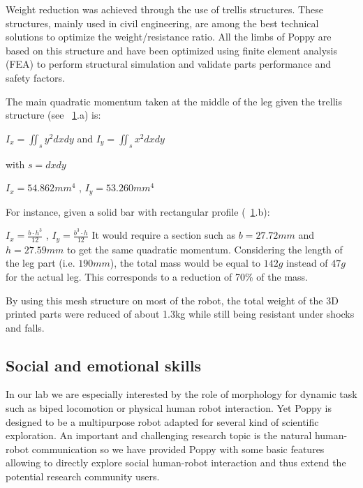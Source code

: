 Weight reduction was achieved through the use of trellis structures.
These structures, mainly used in civil engineering, are among the best technical solutions to optimize the weight/resistance ratio.
All the limbs of Poppy are based on this structure and have been optimized using finite element analysis (FEA) to perform structural simulation and validate parts performance and safety factors.


\begin{figure}[!h]
\centering
    \hfil
    \caption{}
    \label{fig:leg_section}
\end{figure}


The main quadratic momentum taken at the middle of the leg given the trellis structure (see \figurename~\ref{fig:leg_section}.a) is:

\begin{center}
    $I_x = \iint_s y^2 dxdy$ and  $I_y = \iint_s x^2 dxdy$

    with $s = dxdy$
\end{center}
\begin{center}
    $I_x = 54.862 mm^4$
    ,
    $I_y = 53.260 mm^4$
\end{center}

For instance, given a solid bar with rectangular profile (\figurename~\ref{fig:leg_section}.b):

{\centering
    $I_x = \frac{b \cdot h^3}{12}$
    ,
    $I_y = \frac{b^3 \cdot h}{12}$
}
It would require a section such as $b=27.72 mm$ and $h=27.59 mm$ to get the same quadratic momentum.
Considering the length of the leg part (i.e.
$190 mm$), the total mass would be equal to $142 g$ instead of $47 g$ for the actual leg.
This corresponds to a reduction of 70\% of the mass.

By using this mesh structure on most of the robot, the total weight of the 3D
printed parts were reduced of about 1.3kg while still being resistant under shocks and falls.


\subsection{Social and emotional skills} %

In our lab we are especially interested by the role of morphology for dynamic task such as biped locomotion or physical human robot interaction. Yet Poppy is designed to be a multipurpose robot adapted for several kind of scientific exploration.
An important and challenging research topic is the natural human-robot communication so we have provided Poppy with some basic features allowing to directly explore social human-robot interaction and thus extend the potential research community users.

